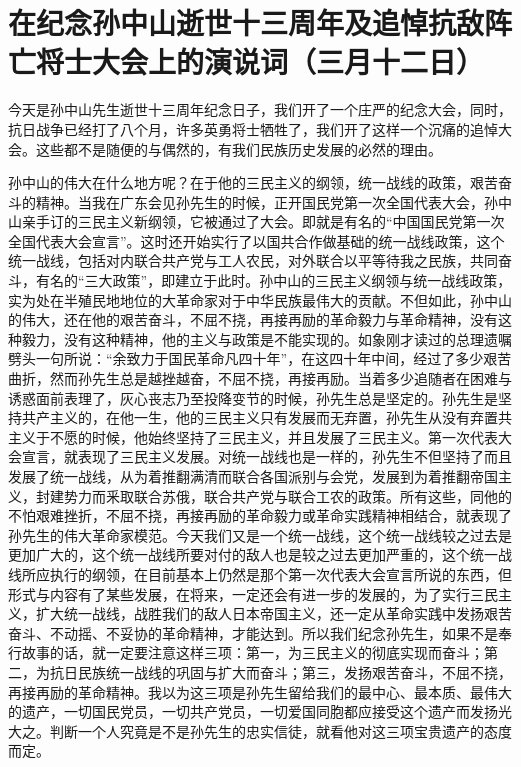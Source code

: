 \section[在纪念孙中山逝世十三周年及追悼抗敌阵亡将士大会上的演说词（三月十二日）]{在纪念孙中山逝世十三周年及追悼抗敌阵亡将士大会上的演说词（三月十二日）}


今天是孙中山先生逝世十三周年纪念日子，我们开了一个庄严的纪念大会，同时，抗日战争已经打了八个月，许多英勇将士牺牲了，我们开了这样一个沉痛的追悼大会。这些都不是随便的与偶然的，有我们民族历史发展的必然的理由。

孙中山的伟大在什么地方呢？在于他的三民主义的纲领，统一战线的政策，艰苦奋斗的精神。当我在广东会见孙先生的时候，正开国民党第一次全国代表大会，孙中山亲手订的三民主义新纲领，它被通过了大会。即就是有名的“中国国民党第一次全国代表大会宣言”。这时还开始实行了以国共合作做基础的统一战线政策，这个统一战线，包括对内联合共产党与工人农民，对外联合以平等待我之民族，共同奋斗，有名的“三大政策”，即建立于此时。孙中山的三民主义纲领与统一战线政策，实为处在半殖民地地位的大革命家对于中华民族最伟大的贡献。不但如此，孙中山的伟大，还在他的艰苦奋斗，不屈不挠，再接再励的革命毅力与革命精神，没有这种毅力，没有这种精神，他的主义与政策是不能实现的。如象刚才读过的总理遗嘱劈头一句所说：“余致力于国民革命凡四十年”，在这四十年中间，经过了多少艰苦曲折，然而孙先生总是越挫越奋，不屈不挠，再接再励。当着多少追随者在困难与诱惑面前表理了，灰心丧志乃至投降变节的时候，孙先生总是坚定的。孙先生是坚持共产主义的，在他一生，他的三民主义只有发展而无弃置，孙先生从没有弃置共主义于不愿的时候，他始终坚持了三民主义，并且发展了三民主义。第一次代表大会宣言，就表现了三民主义发展。对统一战线也是一样的，孙先生不但坚持了而且发展了统一战线，从为着推翻满清而联合各国派别与会党，发展到为着推翻帝国主义，封建势力而釆取联合苏俄，联合共产党与联合工农的政策。所有这些，同他的不怕艰难挫折，不屈不挠，再接再励的革命毅力或革命实践精神相结合，就表现了孙先生的伟大革命家模范。今天我们又是一个统一战线，这个统一战线较之过去是更加广大的，这个统一战线所要对付的敌人也是较之过去更加严重的，这个统一战线所应执行的纲领，在目前基本上仍然是那个第一次代表大会宣言所说的东西，但形式与内容有了某些发展，在将来，一定还会有进一步的发展的，为了实行三民主义，扩大统一战线，战胜我们的敌人日本帝国主义，还一定从革命实践中发扬艰苦奋斗、不动摇、不妥协的革命精神，才能达到。所以我们纪念孙先生，如果不是奉行故事的话，就一定要注意这样三项：第一，为三民主义的彻底实现而奋斗；第二，为抗日民族统一战线的巩固与扩大而奋斗；第三，发扬艰苦奋斗，不屈不挠，再接再励的革命精神。我以为这三项是孙先生留给我们的最中心、最本质、最伟大的遗产，一切国民党员，一切共产党员，一切爱国同胞都应接受这个遗产而发扬光大之。判断一个人究竟是不是孙先生的忠实信徒，就看他对这三项宝贵遗产的态度而定。

